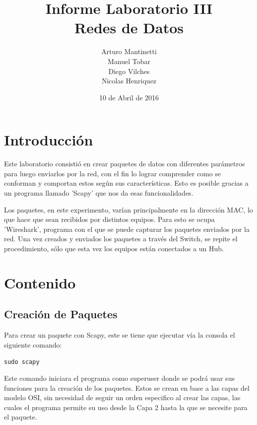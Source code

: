 \documentclass[spanish]{udpreport}
\title{Informe Laboratorio III \\ Redes de Datos}
\author{Arturo Mantinetti \\ Manuel Tobar \\ Diego Vilches \\ Nicolas Henriquez}
\date{10 de Abril de 2016} %
\begin{document}
\maketitle

\tableofcontents

\chapter{Introducción}

Este laboratorio consistió en crear paquetes de datos con diferentes parámetros para luego enviarlos por la red, con el fin lo lograr comprender como se conforman y comportan estos según sus características. Esto es posible gracias a un programa llamado 'Scapy' que nos da esas funcionalidades. 

Los paquetes, en este experimento, varían principalmente en la dirección MAC, lo que hace que sean recibidos por distintos equipos. Para esto se ocupa 'Wireshark', programa con el que se puede capturar los paquetes enviados por la red.  Una vez creados y enviados los paquetes a través del Switch, se repite el procedimiento, sólo que esta vez los equipos están conectados a un Hub. 



\chapter{Contenido}

\section{Creación de Paquetes}
Para crear un paquete con Scapy, este se tiene que ejecutar vía la consola el siguiente comando:
\begin{center}
	\texttt{sudo scapy} %
\end{center}

Este comando iniciara el programa como superuser donde se podrá usar sus funciones para la creación de los paquetes. Estos se crean en base a las capas del modelo OSI, sin necesidad de seguir un orden especifico al crear las capas, las cuales el programa permite su uso desde la Capa 2 hasta la que se necesite para el paquete.
\end{document}
